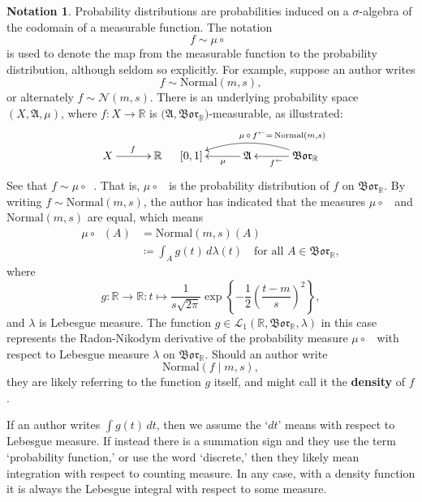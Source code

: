 \documentclass[
twoside=true,
paper=letter,
fontsize=9pt,
pagesize=auto,
leqno,
openany,
headsepline,
overfullrule,
]{scrbook}
\theoremstyle{plain}
\theoremstyle{plain}
\theoremstyle{definition}
\newtheorem{notn}[thm]{Notation}
\theoremstyle{bfnoteitalic}
\theoremstyle{bfnoteroman}
\newcommand{\term}[1]{\textbf{#1}\index{#1}}
\newcommand{\sigalg}[1]{\mathfrak{#1}}
\newcommand{\cali}[1]{\mathscr{#1}}
\newcommand{\definedby}{\coloneqq}
\newcommand{\borel}{\mathfrak{Bor}}
\newcommand{\textsigma}{\hbox{\large{$\sigma$}}\kern-1pt}
\newcommand{\preimage}[1]{\mathop{#1^{\leftarrow}}}
\newcommand{\R}{\mathbb{R}}
\newcommand{\sigmaalgebra}{\sigalg{A}}
\newcommand{\funcf}{f}
\newcommand{\funcg}{g}
\newcommand{\function}{f}
\newcommand{\functionii}{g}
\newcommand{\measurespace}{X}
\newcommand{\measure}{\mu}
\newcommand{\measmu}{\mu}
\newcommand{\measlambda}{\lambda}
\newcommand{\seti}{A}
\begin{document}
\begin{notn}\label{density_functions}
Probability distributions are probabilities induced on a \textsigma-algebra of the codomain of a measurable function. The notation
\[
\function \sim \measure\circ\preimage{\function}
\]
is used to denote the map from the measurable function to the probability distribution, although seldom so explicitly.
For example, suppose an author writes 
\[
\function\sim \text{Normal}(m,s),
\]
or alternately $\function\sim \cali{N}(m,s)$.
There is an underlying probability space
$(\measurespace,\sigmaalgebra,\measmu)$, where 
$\funcf:\measurespace\to\R$
is  
$\bigl(\sigmaalgebra,\borel_\R \bigr)$\hyp{}measurable,
as illustrated:
\[
\xymatrix@R=18pt@C=30pt{\measurespace \ar[r]^\funcf & \R \\}
\quad
\xymatrix@R=18pt@C=30pt{
[0,1]
& \sigmaalgebra 
\ar[l]^-\measmu
& \borel_\R
\ar[l]^{\preimage{\funcf}} 
\ar@/_12pt/[ll]_{\measmu\,\circ\,
\funcf
\makebox[0pt][l]{$\scriptstyle{^\leftarrow =\, \text{Normal}(m,s)}$}}
}
\]
%
%
%
See that
$\function\sim \measmu\circ \preimage{\function}$.
That is, $\measmu\circ \preimage{\function}$ is the probability distribution of $\function$ on 
$\borel_\R$.
By writing $\function\sim \text{Normal}(m,s)$, the author has indicated that the measures 
$\measmu\circ \preimage{\function}$ and
$\text{Normal}(m,s)$ are equal,
which means
\begin{align*}
\measmu\circ \preimage{\function}(\seti) 
&= \text{Normal}(m,s)(\seti) \\
&\definedby\int_\seti \functionii(t)\,d\lambda(t)\quad\text{for all $\seti\in\borel_\R$},
\end{align*}
where 
\[
\functionii :\R\to\R:
t\mapsto
\frac{1}{s\sqrt{2\pi}}
\exp
\left\{
-\frac{1}{2}
\left(
\frac{t-m}{s}
\right)^2
\right\},
\]
and $\measlambda$ is Lebesgue measure.
The function 
$\functionii \in\cali{L}_1(\R,\borel_\R,\lambda)$
in this case represents the Radon-Nikodym derivative of the probability measure
$\measmu \circ \preimage{\function}$
with respect to Lebesgue measure $\lambda$ on $\borel_\R$.
Should an author write 
\[\text{Normal}(\function\mid m,s),\] they are likely referring to the function $\functionii$ itself, and might call it the \term{density} of $\function$. 

If an author  writes $\int \funcg(t)\,dt$, then we assume the `$dt$' means with respect to Lebesgue measure. If instead there is a summation sign and they use the term `probability function,' or use the word `discrete,' then they likely mean integration with respect to counting measure.  In any case, with a density function it is always the Lebesgue integral with respect to some measure.
\end{notn}
\end{document}

